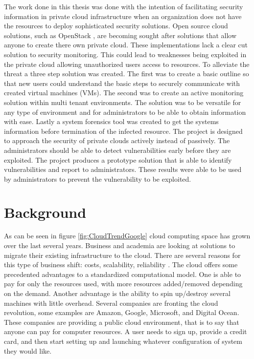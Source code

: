 \documentclass[12pt]{article}
\begin{document}
The work done in this thesis was done with the intention of facilitating security information in private cloud infrastructure when an organization does not have the resources to deploy sophisticated security solutions. Open source cloud solutions, such as OpenStack \cite{Openstack}, are becoming sought after solutions that allow anyone to create there own private cloud. These implementations lack a clear cut solution to security monitoring. This could lead to weaknesses being exploited in the private cloud allowing unauthorized users access to resources. To alleviate the threat a three step solution was created. The first was to create a basic outline so that new users could understand the basic steps to securely communicate with created virtual machines (VMs). The second was to create an active monitoring solution within multi tenant environments. The solution was to be versatile for any type of environment and for administrators to be able to obtain information with ease. Lastly a system forensics tool was created to get the systems information before termination of the infected resource. The project is designed to approach the security of private clouds actively instead of passively. The administrators should be able to detect vulnerabilities early before they are exploited. The project produces a prototype solution that is able to identify vulnerabilities and report to administrators. These results were able to be used by administrators to prevent the vulnerability to be exploited.

\section{Background}
As can be seen in figure \ref{fig:CloudTrendGoogle} cloud computing space has grown over the last several years. Business and academia are looking at solutions to migrate their existing infrastructure to the cloud. There are several reasons for this type of business shift: costs, scalability, reliability \cite{DillonWuChang}. The cloud offers some precedented advantages to a standardized computational model. One is able to pay for only the resources used, with more resources added/removed depending on the demand. Another advantage is the ability to spin up/destroy several machines with little overhead. Several companies are fronting the cloud revolution, some examples are Amazon\cite{amazonaws2017}, Google\cite{GoogleCloudCompute2017}, Microsoft\cite{Azure2017}, and Digital Ocean\cite{DigitalOcian2017}. These companies are providing a public cloud environment, that is to say that anyone can pay for computer resources. A user needs to sign up, provide a credit card, and then start setting up and launching whatever configuration of system they would like.
\end{document}
